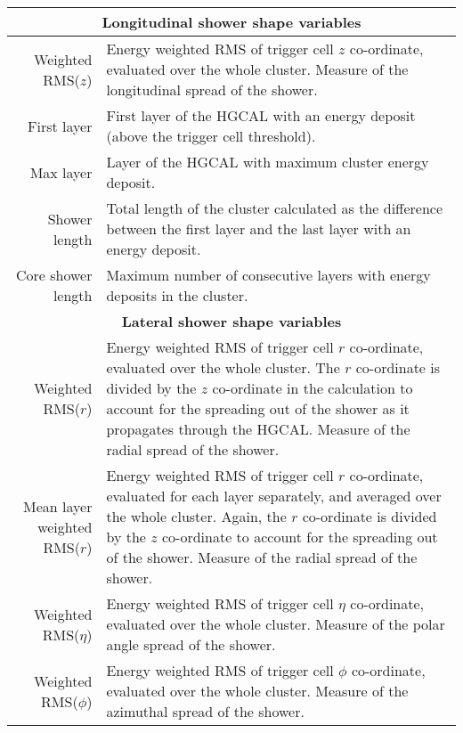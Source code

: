 \begin{tabular}{r|p{}}
    \hline
    \multicolumn{2}{c}{\textbf{Longitudinal shower shape variables}} \\ \hline
    Weighted RMS($z$) & Energy weighted RMS of trigger cell $z$ co-ordinate, evaluated over the whole cluster. Measure of the longitudinal spread of the shower. \\
    First layer & First layer of the HGCAL with an energy deposit (above the trigger cell threshold). \\
    Max layer &  Layer of the HGCAL with maximum cluster energy deposit. \\
    Shower length & Total length of the cluster calculated as the difference between the first layer and the last layer with an energy deposit. \\
    Core shower length & Maximum number of consecutive layers with energy deposits in the cluster. \\
    \hline
    \multicolumn{2}{c}{\textbf{Lateral shower shape variables}} \\ \hline
    Weighted RMS($r$) & Energy weighted RMS of trigger cell $r$ co-ordinate, evaluated over the whole cluster. The $r$ co-ordinate is divided by the $z$ co-ordinate in the calculation to account for the spreading out of the shower as it propagates through the HGCAL. Measure of the radial spread of the shower. \\
    Mean layer weighted RMS($r$) & Energy weighted RMS of trigger cell $r$ co-ordinate, evaluated for each layer separately, and averaged over the whole cluster. Again, the $r$ co-ordinate is divided by the $z$ co-ordinate to account for the spreading out of the shower. Measure of the radial spread of the shower. \\
    Weighted RMS($\eta$) & Energy weighted RMS of trigger cell $\eta$ co-ordinate, evaluated over the whole cluster. Measure of the polar angle spread of the shower. \\
    Weighted RMS($\phi$) & Energy weighted RMS of trigger cell $\phi$ co-ordinate, evaluated over the whole cluster. Measure of the azimuthal spread of the shower.\\
    \hline
\end{tabular}